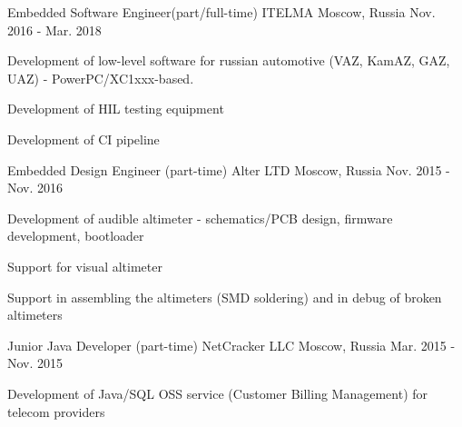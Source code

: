 \begin{cventries}

\cventry
{Embedded Software Engineer(part/full-time)} %
{ITELMA} %
{Moscow, Russia} %
{Nov. 2016 - Mar. 2018} %
{ %
\begin{cvitems}
\item {Development of low-level software for russian automotive (VAZ, KamAZ, GAZ, UAZ) - PowerPC/XC1xxx-based.}
\item {Development of HIL testing equipment}
\item {Development of CI pipeline}
\end{cvitems}
}


\cventry
{Embedded Design Engineer (part-time)} %
{Alter LTD} %
{Moscow, Russia} %
{Nov. 2015 - Nov. 2016} %
{ %
\begin{cvitems}
\item {Development of audible altimeter - schematics/PCB design, firmware development, bootloader }
\item {Support for visual altimeter}
\item {Support in assembling the altimeters (SMD soldering) and in debug of broken altimeters}
\end{cvitems}
}


\cventry
{Junior Java Developer (part-time)} %
{NetCracker LLC} %
{Moscow, Russia} %
{Mar. 2015 - Nov. 2015} %
{ %
\begin{cvitems}
\item {Development of Java/SQL OSS service (Customer Billing Management) for telecom providers}
\end{cvitems}
}

\end{cventries}